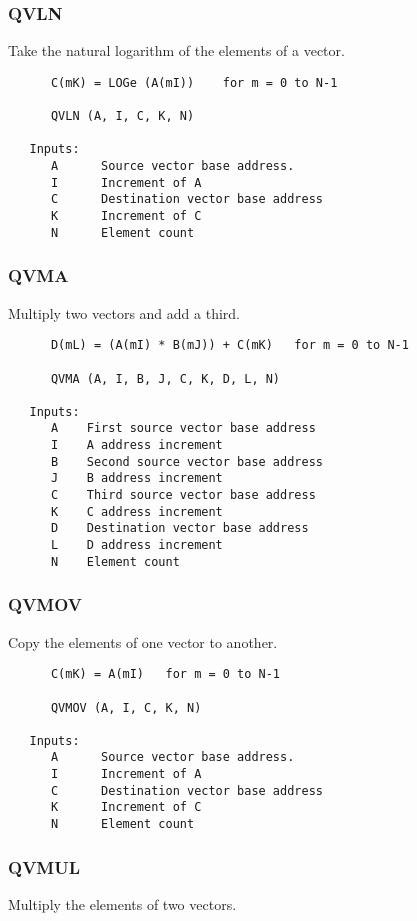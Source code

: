 \subsubsection{QVLN }
Take the natural logarithm of the elements of a vector.

\begin{verbatim}
      C(mK) = LOGe (A(mI))    for m = 0 to N-1

      QVLN (A, I, C, K, N)

   Inputs:
      A      Source vector base address.
      I      Increment of A
      C      Destination vector base address
      K      Increment of C
      N      Element count

\end{verbatim}
\subsubsection{QVMA }
Multiply two vectors and add a third.

\begin{verbatim}
      D(mL) = (A(mI) * B(mJ)) + C(mK)   for m = 0 to N-1

      QVMA (A, I, B, J, C, K, D, L, N)

   Inputs:
      A    First source vector base address
      I    A address increment
      B    Second source vector base address
      J    B address increment
      C    Third source vector base address
      K    C address increment
      D    Destination vector base address
      L    D address increment
      N    Element count

\end{verbatim}
\subsubsection{QVMOV }
Copy the elements of one vector to another.

\begin{verbatim}
      C(mK) = A(mI)   for m = 0 to N-1

      QVMOV (A, I, C, K, N)

   Inputs:
      A      Source vector base address.
      I      Increment of A
      C      Destination vector base address
      K      Increment of C
      N      Element count

\end{verbatim}
\subsubsection{QVMUL }
Multiply the elements of two vectors.

